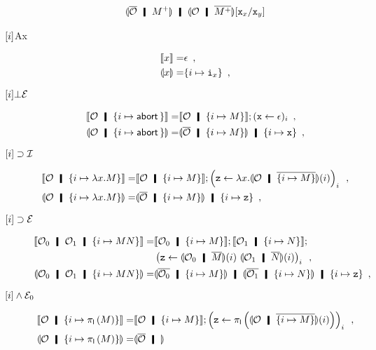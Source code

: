 \begin{description}
\begin{align*}
       \semoi{\overline{\hypert}\hmid \m{M}} \hmid
       \semoi{{\hypert}\hmid \overline{\m{M}}}[\p x_x/ \p x_y]
      \end{align*}
 \item[$\lbrack {i}\rbrack$Ax]
      \begin{align*}
       \llbracket{x}\rrbracket=& \epsilon \enspace,\\
       \llparenthesis{x}\rrparenthesis=& \{i\mapsto \texttt{i}_x\}\enspace,
      \end{align*}
 \item[${\lbrack {i}\rbrack}\bot\mathcal E$]
      \begin{align*}
       \semo{\hypert\hmid\{i\mapsto\abort\}}
       =&\semo{\hypert\hmid\{i\mapsto M\}} ; (\p x\leftarrow \epsilon)_i\enspace,\\
       \semoi{\hypert\hmid\{i\mapsto\abort\}}
       =&\semoi{\overline{\hypert}\hmid\{i\mapsto M\}} \hmid \{i\mapsto
       \p x\}\enspace,
      \end{align*}
 \item[$\lbrack {i}\rbrack\supset\mathcal I$]
\begin{align*}
 \semo{\hypert\hmid \{i\mapsto \lambda x.M\}}=
 & \semo{\hypert\hmid \imapsto{M}}; \left(\p z\leftarrow
 \lambda x. \semoi{\hypert\hmid\overline{\imapsto{M}}}(i)\right)_i \enspace,\\
 \semoi{\hypert\hmid \imapsto{\lambda x.M}} =& \semoi{\overline\hypert\hmid
 \imapsto{M}} \hmid \{i\mapsto \p z\}\enspace,
\end{align*}
 \item[$\lbrack {i}\rbrack\supset\mathcal E$]
\begin{align*}
 \semo{\hypert_0\hmid\hypert_1\hmid \imapsto{MN}}=&
 \semo{\hypert_0\hmid \imapsto{M}};
 \semo{\hypert_1\hmid \imapsto{N}};\\&
 \left(\p z\leftarrow \semoi{\hypert_0\hmid \overline{
 M}}(i)\,\,\semoi{\hypert_1\hmid \overline N}(i)\right)_i\enspace,\\
 \semoi{\hypert_0\hmid\hypert_1\hmid \imapsto{MN}} =&
 \semoi{\overline{\hypert_0}\hmid \imapsto{M}} \hmid
 \semoi{\overline{\hypert_1}\hmid \imapsto{N}}
 \hmid \{i\mapsto \p z\}\enspace,
\end{align*}
 \item[$\lbrack {i}\rbrack\wedge\mathcal E_0$]
\begin{align*}
 \semo{\hypert\hmid \imapsto{\lpil M}} =& \semo{\hypert\hmid \imapsto{M}};
 \left(\p z \leftarrow
 \lpil {\semoi{\hypert\hmid\overline{\imapsto{M}}}(i)}\right)_i\enspace, \\
 \semoi{\hypert\hmid \imapsto{\lpil M}}=& \semoi{\overline \hypert\hmid
}
\end{align*}
\end{description}
